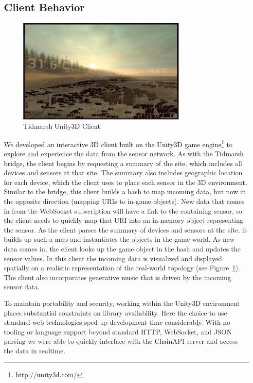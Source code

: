 \documentclass{acm_proc_article-sp}
\begin{document}
\subsection{Client Behavior}

\begin{figure}
    \centering
    \includegraphics[width=8.45cm]{tidmarsh_screenshot}
    \caption{Tidmarsh Unity3D Client}
    \label{tidmarsh_screenshot}
\end{figure}

We developed an interactive 3D client built on the Unity3D game
engine\footnote{http://unity3d.com/} to explore and experience the data from
the sensor network. As with the Tidmarsh bridge, the client begins by
requesting a summary of the site, which includes all devices and sensors at
that site. The summary also includes geographic location for each device, which
the client uses to place each sensor in the 3D environment. Similar to the
bridge, this client builds a hash to map incoming data, but now in the opposite
direction (mapping URIs to in-game objects). New data that comes in from the
WebSocket subscription will have a link to the containing sensor, so the client
needs to quickly map that URI into an in-memory object representing the sensor.
As the client parses the summary of devices and sensors at the site, it builds
up such a map and instantiates the objects in the game world. As new data comes
in, the client looks up the game object in the hash and updates the sensor
values. In this client the incoming data is visualized and displayed spatially
on a realistic representation of the real-world topology (see
Figure~\ref{tidmarsh_screenshot}). The client also incorporates generative
music that is driven by the incoming sensor data.

To maintain portability and security, working within the Unity3D environment
places substantial constraints on library availability. Here the choice to use
standard web technologies sped up development time considerably. With no
tooling or language support beyond standard HTTP, WebSocket, and JSON parsing
we were able to quickly interface with the ChainAPI server and access the data
in realtime.
\end{document}
